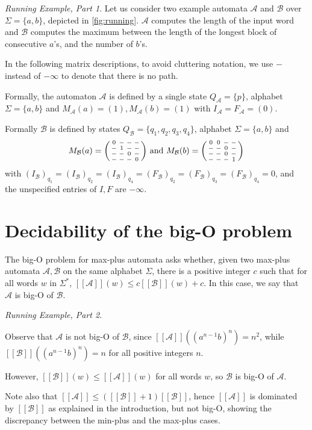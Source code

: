 \documentclass{lmcs}
\theoremstyle{remark}
\newcommand{\autA}{\mathcal{A}}
\newcommand{\autB}{\mathcal{B}}
\newcommand{\brfunc}[1]{[\![#1]\!]}
\newcommand{\funcA}{\brfunc{\autA}}
\newcommand{\funcB}{\brfunc{\autB}}
\newcommand{\nopath}{-}
\newenvironment{smallpmatrix}
  {\left(\begin{smallmatrix}}
  {\end{smallmatrix}\right)}
\theoremstyle{remark}
\newtheorem{runningexample/}{Running Example, Part}
\newenvironment{runningexample}
  {\renewcommand{\qedsymbol}{\color{darkgray}\ensuremath{\lrcorner}}%
   \pushQED{\qed}\begin{runningexample/}}
  {\popQED\end{runningexample/}}
\begin{document}
\begin{runningexample}\label{eg:running}
Let us consider two example automata $\autA$ and $\autB$ over $\Sigma = \{a,b\}$, depicted in \cref{fig:running}.
$\autA$ computes the length of the input word and $\autB$ computes the maximum between the length of the longest block of consecutive $a$'s, and the number of $b$'s.

In the following matrix descriptions, to avoid cluttering notation, we use $\nopath$ instead of $-\infty$ to denote that there is no path.

Formally, the automaton $\autA$ is defined by a single state $Q_\autA = \{p\}$, alphabet $\Sigma = \{a,b\}$ and $M_{\autA}(a) = (1), M_{\autA}(b) = (1)$ with $I_\autA = F_\autA = (0)$. 

Formally $\autB$ is defined by states $Q_\autB = \{q_1,q_2,q_3,q_4\}$, alphabet $\Sigma = \{a,b\}$ and 
\[M_{\autB}(a) = 
\begin{smallpmatrix}
0 & \nopath & \nopath & \nopath\\
\nopath & 1 & \nopath & \nopath\\
\nopath & \nopath & 0 & \nopath\\
\nopath & \nopath & \nopath & 0
\end{smallpmatrix} \text{ and }M_{\autB}(b) = 
\begin{smallpmatrix}
0 & 0 & \nopath & \nopath\\
\nopath & \nopath & 0 & \nopath\\
\nopath & \nopath & 0 & \nopath\\
\nopath & \nopath & \nopath & 1
\end{smallpmatrix}\]
with $(I_\autB)_{q_1} =(I_\autB)_{q_2} = (I_\autB)_{q_4} =(F_\autB)_{q_2} = (F_\autB)_{q_3} = (F_\autB)_{q_4} = 0$, and the unspecified entries of $I,F$ are $-\infty$. 
\end{runningexample}

\section{Decidability of the big-O problem}
\label{sec:bigO}

The big-O problem for max-plus automata asks whether, given two max-plus automata $\autA,\autB$ on the same alphabet $\Sigma$, there is a positive integer $c$ such that for all words $w$ in $\Sigma^*$, $\funcA(w) \leq c\funcB(w) + c$. In this case, we say that $\autA$ is big-O of $\autB$.
\begin{runningexample}\label{re:notbig-O}

Observe that $\autA$ is not big-O of $\autB$, since $\funcA((a^{n-1}b)^n) = n^2$, while $\funcB((a^{n-1}b)^n) = n$ for all positive integers $n$.

However, $\funcB(w) \le \funcA(w)$ for all words $w$, so $\autB$ is big-O of $\autA$.

Note also that $\funcA \le (\funcB + 1)\funcB$, hence $\funcA$ is dominated by $\funcB$ as explained in the introduction, but not big-O, showing the discrepancy between the min-plus and the max-plus cases. 
\end{runningexample}
\end{document}
